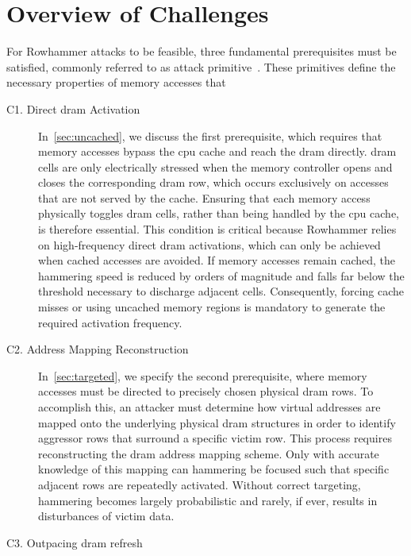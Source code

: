 \section{Overview of Challenges} \label{sec:overview-of-challenges}
  For Rowhammer attacks to be feasible, three fundamental prerequisites must be satisfied, commonly referred
  to as attack primitive~\cite{presRHAttacksWalkthrough, toolRowhammering}. These primitives define the necessary properties of memory accesses that 


  \begin{description}
    \item[C1. Direct \gls{dram} Activation] \label{ch:uncached}
      In~\cref{sec:uncached}, we discuss the first prerequisite, which requires that memory accesses bypass 
      the \gls{cpu} cache and reach the \gls{dram} directly. \gls{dram} cells are only electrically stressed when the memory controller opens 
      and closes the corresponding \gls{dram} row, which occurs exclusively on accesses that are not served by the cache. 
      Ensuring that each memory access physically toggles \gls{dram} cells, rather than being handled by the \gls{cpu} cache, 
      is therefore essential. This condition is critical because Rowhammer relies on high-frequency direct \gls{dram} 
      activations, which can only be achieved when cached accesses are avoided. If memory accesses remain cached, 
      the hammering speed is reduced by orders of magnitude and falls far below the threshold necessary to discharge 
      adjacent cells. Consequently, forcing cache misses or using uncached memory regions is mandatory to generate 
      the required activation frequency.
    \item[C2. Address Mapping Reconstruction] \label{ch:targeted}
      In~\cref{sec:targeted}, we specify the second prerequisite, where memory accesses must be directed to 
      precisely chosen physical \gls{dram} rows. To accomplish this, an attacker must determine how virtual addresses are mapped onto the 
      underlying physical \gls{dram} structures in order to identify aggressor rows that surround a specific victim row. 
      This process requires reconstructing the \gls{dram} address mapping scheme. Only with accurate knowledge of this 
      mapping can hammering be focused such that specific adjacent rows are repeatedly activated. Without correct 
      targeting, hammering becomes largely probabilistic and rarely, if ever, results in disturbances of victim data.
    \item[C3. Outpacing \gls{dram} refresh] \label{ch:fast}

\end{description}
